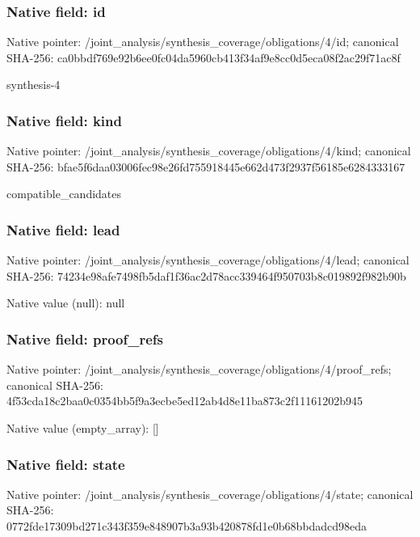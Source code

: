 \documentclass[10pt,a4paper]{article}
\begin{document}
\subsubsection{Native field: id}
Native pointer: /joint\_\allowbreak{}analysis/synthesis\_\allowbreak{}coverage/obligations/4/id; canonical SHA-256: ca0bbdf769e92b6ee0fc04da5960cb413f34af9e8cc0d5eca08f2ac29f71ac8f

\begingroup\raggedright\sloppy synthesis-4\par\endgroup

\subsubsection{Native field: kind}
Native pointer: /joint\_\allowbreak{}analysis/synthesis\_\allowbreak{}coverage/obligations/4/kind; canonical SHA-256: bfae5f6daa03006fec98e26fd755918445e662d473f2937f56185e6284333167

\begingroup\raggedright\sloppy compatible\_\allowbreak{}candidates\par\endgroup

\subsubsection{Native field: lead}
Native pointer: /joint\_\allowbreak{}analysis/synthesis\_\allowbreak{}coverage/obligations/4/lead; canonical SHA-256: 74234e98afe7498fb5daf1f36ac2d78acc339464f950703b8c019892f982b90b

Native value (null): null

\subsubsection{Native field: proof\_\allowbreak{}refs}
Native pointer: /joint\_\allowbreak{}analysis/synthesis\_\allowbreak{}coverage/obligations/4/proof\_\allowbreak{}refs; canonical SHA-256: 4f53cda18c2baa0c0354bb5f9a3ecbe5ed12ab4d8e11ba873c2f11161202b945

Native value (empty\_\allowbreak{}array): []

\subsubsection{Native field: state}
Native pointer: /joint\_\allowbreak{}analysis/synthesis\_\allowbreak{}coverage/obligations/4/state; canonical SHA-256: 0772fde17309bd271c343f359e848907b3a93b420878fd1e0b68bbdadcd98eda
\end{document}
